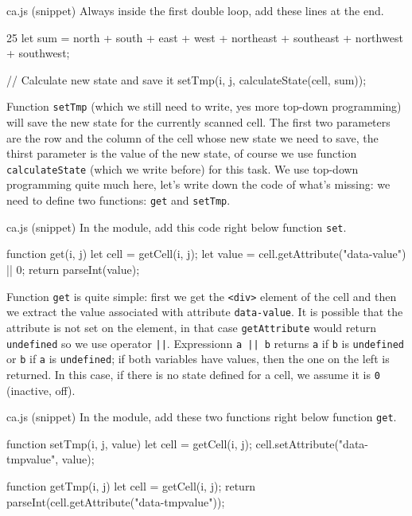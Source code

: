 \begin{programcode}{ca.js (snippet)}
Always inside the first double loop, add these lines at the end.
\begin{codeh1}{2}{5}
let sum = north + south + east + west + northeast + southeast + northwest + southwest;

// Calculate new state and save it
setTmp(i, j, calculateState(cell, sum));
\end{codeh1}
\end{programcode}

Function \texttt{setTmp} (which we still need to write, yes more top-down programming) will save the new state
for the currently scanned cell. The first two parameters are the row and the column of the cell whose
new state we need to save, the thirst parameter is the value of the new state, of course we use function
\texttt{calculateState} (which we write before) for this task. We use top-down programming quite much here,
let's write down the code of what's missing: we need to define two functions: \texttt{get} and \texttt{setTmp}.

\begin{programcode}{ca.js (snippet)}
In the module, add this code right below function \texttt{set}.
\begin{code}
function get(i, j) {
  let cell = getCell(i, j);
  let value = cell.getAttribute("data-value") || 0;
  return parseInt(value);
}
\end{code}
\end{programcode}

Function \texttt{get} is quite simple: first we get the \texttt{<div>} element of the cell and then we
extract the value associated with attribute \texttt{data-value}. It is possible that the attribute
is not set on the element, in that case \texttt{getAttribute} would return \texttt{undefined} so we
use operator \texttt{||}. Expressionn \texttt{a || b} returns \texttt{a} if \texttt{b} is \texttt{undefined}
or \texttt{b} if \texttt{a} is \texttt{undefined}; if both variables have values, then the one on the
left is returned. In this case, if there is no state defined for a cell, we assume it is \texttt{0}
(inactive, off).

\begin{programcode}{ca.js (snippet)}
In the module, add these two functions right below function \texttt{get}.
\begin{code}
function setTmp(i, j, value) {
  let cell = getCell(i, j);
  cell.setAttribute("data-tmpvalue", value);
}

function getTmp(i, j) {
  let cell = getCell(i, j);
  return parseInt(cell.getAttribute("data-tmpvalue"));
}
\end{code}
\end{programcode}

